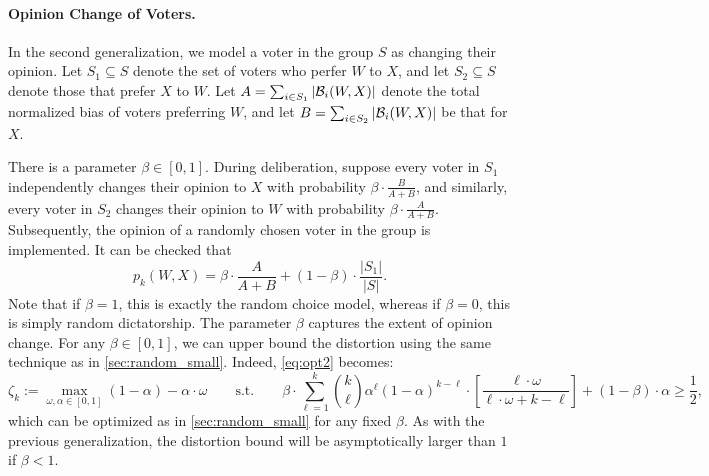 \paragraph{Opinion Change of Voters.} In the second generalization, we model a voter in the group $S$ as changing their opinion. Let $S_1 \subseteq S$ denote the set of voters who perfer $W$ to $X$, and let $S_2 \subseteq S$ denote those that prefer $X$ to $W$. Let $A = \sum_{i \in S_1} |\mathcal{B}_i(W,X)|$ denote the total normalized bias of voters preferring $W$, and let $B = \sum_{i \in S_2} |\mathcal{B}_i(W,X)|$ be that for $X$. 

There is a parameter $\beta \in [0,1]$. During deliberation, suppose every voter in $S_1$ independently changes their opinion to $X$ with probability $\beta \cdot \frac{B}{A+B}$, and similarly, every voter in $S_2$ changes their opinion to $W$ with probability $\beta \cdot \frac{A}{A+B}$. Subsequently, the opinion of a randomly chosen voter in the group is implemented. It can be checked that
$$ p_k(W,X) = \beta \cdot \frac{A}{A+B} + (1-\beta) \cdot \frac{|S_1|}{|S|}.$$
Note that if $\beta = 1$, this is exactly the random choice model, whereas if $\beta = 0$, this is simply random dictatorship. The parameter $\beta$ captures the extent of opinion change. For any $\beta \in [0,1]$, we can upper bound the distortion using the same technique as in \cref{sec:random_small}. Indeed, \cref{eq:opt2} becomes:
\begin{equation*} 
\zeta_k := \max_{\omega, \alpha \in [0,1]} (1-\alpha) - \alpha \cdot \omega \qquad \mbox{s.t.} \qquad 
\beta \cdot \sum_{\ell = 1}^k {k \choose \ell} \alpha^{\ell} (1-\alpha)^{k-\ell} \cdot
\left[ \frac{\ell \cdot \omega}{\ell \cdot \omega + k-\ell } \right] + (1-\beta) \cdot \alpha \ge \frac{1}{2},
\end{equation*}
which can be optimized  as in \cref{sec:random_small} for any fixed $\beta$. As with the previous generalization, the distortion bound will be asymptotically larger than $1$ if $\beta < 1$.